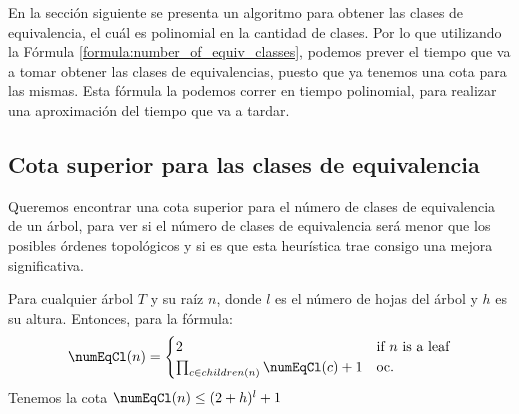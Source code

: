 
En la sección siguiente se presenta un algoritmo para obtener las clases de equivalencia, el cuál es polinomial en la cantidad de clases. Por lo que utilizando la Fórmula \ref{formula:number_of_equiv_classes}, podemos prever el tiempo que va a tomar obtener las clases de equivalencias, puesto que ya tenemos una cota para las mismas. Esta fórmula la podemos correr en tiempo polinomial, para realizar una aproximación del tiempo que va a tardar. %
\begin{comment}
    Hay un caso que no estamos considerando, y es cuando los nodos no relacionados tienen ancestros. Pero ese es el mismo caso para el cual \emph{no pudimos encontrar una respuesta} en el conteo de los ordenes topológicos. En este caso, sería fácil solucionarlo, ya que solo necesitarías conectar $r_0$ a la nueva raíz del subárbol. El problema surge si el subárbol tiene múltiples raíces, entonces la fórmula que definimos anteriormente no sería suficiente, porque estaría contando algunos escenarios dos veces.    
    Al final no lo agregué, no suma tanto. 
\end{comment}

\subsection{Cota superior para las clases de equivalencia}

Queremos encontrar una cota superior para el número de clases de equivalencia de un árbol, para ver si el número de clases de equivalencia será menor que los posibles órdenes topológicos y si es que esta heurística trae consigo una mejora significativa. 

\begin{lemma}\label{lemma:upper_bound_equivalence_classes}
    Para cualquier árbol $T$ y su raíz $n$, donde $l$ es el número de hojas del árbol y $h$ es su altura. Entonces, para la fórmula: 
    \[
    \numEqCl(n) = 
    \begin{cases} 
    2 & \text{if $n$ is a leaf} \\
    \prod_{c \in children(n)} \numEqCl(c) + 1 & \text{oc.}
    \end{cases}
    \]
    Tenemos la cota $\numEqCl(n) \leq (2+h)^l + 1$
      
\end{lemma}

